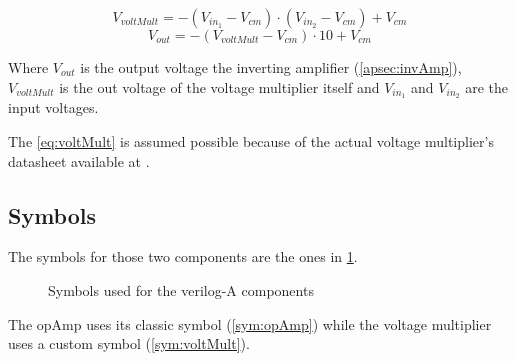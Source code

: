 \begin{equation}\label{eq:voltMult}
  V_{voltMult}=-(V_{in_1}-V_{cm})\cdot (V_{in_2}-V_{cm}) + V_{cm}
\end{equation}
\begin{equation}\label{eq:invAmp}
  V_{out}=-(V_{voltMult}-V_{cm})\cdot10+V_{cm}
\end{equation}

Where $V_{out}$ is the output voltage the inverting amplifier (\cref{apsec:invAmp}), $V_{voltMult}$ is the out voltage of the voltage multiplier itself and $V_{in_1}$ and $V_{in_2}$ are the input voltages.

The \cref{eq:voltMult} is assumed possible because of the actual voltage multiplier's datasheet available at \cite{actualVoltMult}.

\subsection{Symbols}

The symbols for those two components are the ones in \cref{sym:models}.

\begin{figure}[H]
  \centering
  \hspace*{2cm}
  \hfill
  \hspace*{2cm}
  \caption{Symbols used for the verilog-A components}
  \label{sym:models}
\end{figure}

The \ac{opAmp} uses its classic symbol (\cref{sym:opAmp}) while the voltage multiplier uses a custom symbol (\cref{sym:voltMult}).
